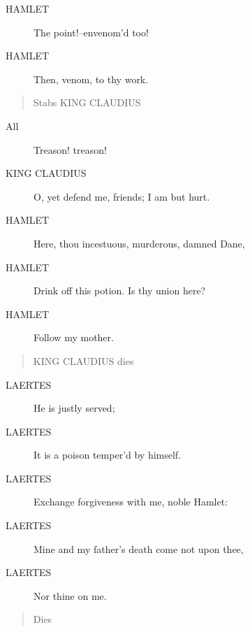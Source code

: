 \documentclass{article}
\begin{document}
\begin{description}
            
\item[HAMLET] The point!--envenom'd too!
\item[HAMLET] Then, venom, to thy work.
\end{description}
          
\begin{quote}
Stabs KING CLAUDIUS
\end{quote}
          
\begin{description}
            
\item[All] Treason! treason!
\end{description}
          
\begin{description}
            
\item[KING CLAUDIUS] O, yet defend me, friends; I am but hurt.
\end{description}
          
\begin{description}
            
\item[HAMLET] Here, thou incestuous, murderous, damned Dane,
\item[HAMLET] Drink off this potion. Is thy union here?
\item[HAMLET] Follow my mother.
\end{description}
          
\begin{quote}
KING CLAUDIUS dies
\end{quote}
          
\begin{description}
            
\item[LAERTES] He is justly served;
\item[LAERTES] It is a poison temper'd by himself.
\item[LAERTES] Exchange forgiveness with me, noble Hamlet:
\item[LAERTES] Mine and my father's death come not upon thee,
\item[LAERTES] Nor thine on me.
\end{description}
          
\begin{quote}
Dies
\end{quote}
          
\end{document}
